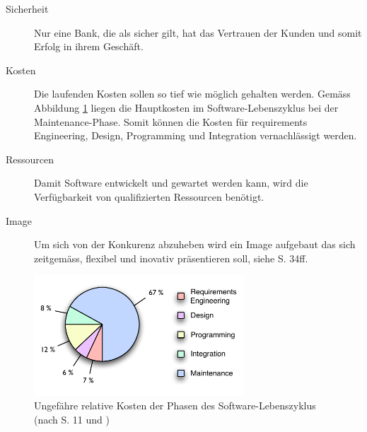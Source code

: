   \begin{description}
    \item[Sicherheit]
    Nur eine Bank, die als sicher gilt, hat das Vertrauen der Kunden und somit
    Erfolg in ihrem Geschäft.
    \item[Kosten]
    Die laufenden Kosten sollen so tief wie möglich gehalten werden. Gemäss
    Abbildung \ref{img:softwareLifecycleCost} liegen die Hauptkosten im
    Software-Lebenszyklus bei der Maintenance-Phase. Somit können die Kosten für
    requirements Engineering, Design, Programming und Integration vernachlässigt
    werden.
    \item[Ressourcen]
    Damit Software entwickelt und gewartet werden kann, wird die Verfügbarkeit
    von qualifizierten Ressourcen benötigt.
    \item[Image]
    Um sich von der Konkurenz abzuheben wird ein Image aufgebaut das sich
    zeitgemäss, flexibel und inovativ präsentieren soll, siehe
    \cite{WillkommenBeiDerZkb} S. 34ff.
  \end{description}
  
  \begin{figure}[ht]
    \begin{center}
      \includegraphics[width=0.7\textwidth]{./image/softwareLifeCycleCost.pdf}
      \caption{Ungefähre relative Kosten der Phasen des Software-Lebenszyklus
      (nach \cite{SoftwareEngineering} S. 11 und
      \cite{SoftwareLifeCycleModels})}
      \label{img:softwareLifecycleCost}
    \end{center}
  \end{figure}
  
